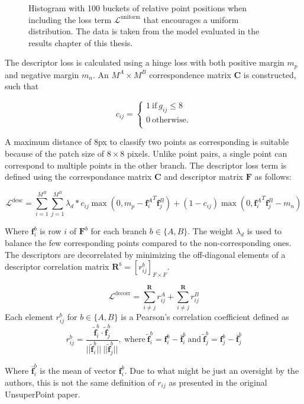 \begin{figure}[H]
	\begin{center}
		
	\end{center}
	\caption{Histogram with 100 buckets of relative point positions when including the loss term $\mathcal{L}^{\textrm{uniform}}$ that encourages a uniform distribution. The data is taken from the model evaluated in the results chapter of this thesis.}
	\label{fig:hist-unixy}
\end{figure}

The descriptor loss is calculated using a hinge loss with both positive margin $m_p$ and negative margin $m_n$. An $M^A\times M^B$ correspondence matrix $\textbf{C}$ is constructed, such that

\begin{equation}
c_{ij}=
\begin{cases}
1\ \text{if}\ g_{ij}\le 8 \\
0\ \text{otherwise.} \\
\end{cases}
\end{equation}

A maximum distance of 8px to classify two points as corresponding is suitable because of the patch size of $8\times 8$ pixels. Unlike point pairs, a single point can correspond to multiple points in the other branch. The descriptor loss term is defined using the correspondance matrix $\textbf{C}$ and descriptor matrix $\textbf{F}$ as follows:

\begin{equation}
\mathcal{L}^{\textrm{desc}}=\sum^{M^B}_{i=1}\sum^{M^B}_{j=1}\lambda_d*c_{ij}\max\left(0,m_p-{\textbf{f}_i^A}^T\textbf{f}_j^B\right)+(1-c_{ij})\max\left(0,{\textbf{f}_i^A}^T\textbf{f}_j^B-m_n\right)
\end{equation}

Where $\textbf{f}^b_i$ is row $i$ of $\textbf{F}^b$ for each branch $b\in\{A,B\}$. The weight $\lambda_d$ is used to balance the few corresponding points compared to the non-corresponding ones. The descriptors are decorrelated by minimizing the off-diagonal elements of a descriptor correlation matrix $\textbf{R}^b=[r^b_{ij}]_{F\times F}$.

\begin{equation}
\mathcal{L}^{\textrm{decorr}}=\sum^{\textbf{R}}_{i\neq j}r_{ij}^A+\sum^{\textbf{R}}_{i\neq j}r_{ij}^B
\end{equation}
Each element $r^b_{ij}$ for $b\in\{A,B\}$ is a Pearson's correlation coefficient\cite{pearsons} defined as
\begin{equation}
r^b_{ij}=
\frac{ \tilde{\textbf{f}}_i^b \cdot \tilde{\textbf{f}}_j^b }{
||\tilde{\textbf{f}}_i^b||\ ||\tilde{\textbf{f}}_j^b||
}
,\ \text{where}\ 
\tilde{\textbf{f}}_i^b=\textbf{f}_i^b-\bar{\textbf{f}}^b_i
\ \text{and}\ 
\tilde{\textbf{f}}_j^b=\textbf{f}_j^b-\bar{\textbf{f}}^b_j
\end{equation}

Where $\bar{\textbf{f}}^b_i$ is the mean of vector $\textbf{f}^b_i$. Due to what might be just an oversight by the authors, this is not the same definition of $r_{ij}$ as presented in the original UnsuperPoint paper.